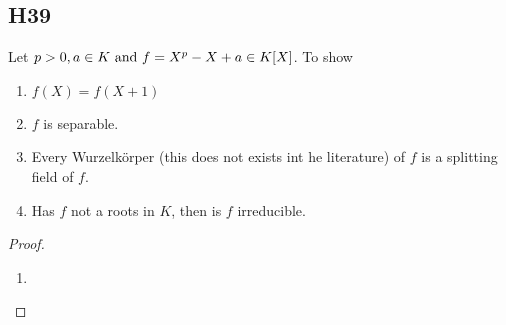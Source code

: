 \subsection{H39}
Let $p > 0, a \in K \text{ and } f = X^p - X + a \in K[X]$. To show
\begin{enumerate}
	\item $f(X) = f(X+1)$
	\item $f$ is separable.
	\item Every Wurzelkörper (this does not exists int he literature) of $f$ is a splitting field of $f$.
	\item Has $f$ not a roots in $K$, then is $f$ irreducible. 
\end{enumerate}
\begin{proof}
	\begin{enumerate}
		\item 
	\end{enumerate}
\end{proof}